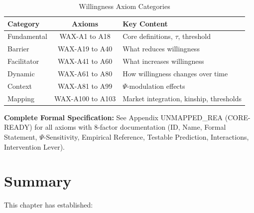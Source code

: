\begin{table}[h]
\centering
\caption{Willingness Axiom Categories}
\label{tab:axiom-categories}
\begin{tabular}{lcp{6cm}}
\toprule
\textbf{Category} & \textbf{Axioms} & \textbf{Key Content}\\
\midrule
Fundamental & WAX-A1 to A18 & Core definitions, $\tau$, threshold\\
Barrier & WAX-A19 to A40 & What reduces willingness\\
Facilitator & WAX-A41 to A60 & What increases willingness\\
Dynamic & WAX-A61 to A80 & How willingness changes over time\\
Context & WAX-A81 to A99 & $\Psi$-modulation effects\\
Mapping & WAX-A100 to A103 & Market integration, kinship, thresholds\\
\bottomrule
\end{tabular}
\end{table}

\begin{cross-reference}
\textbf{Complete Formal Specification:} See Appendix UNMAPPED_REA (CORE-READY) for all axioms
with 8-factor documentation (ID, Name, Formal Statement, $\Psi$-Sensitivity,
Empirical Reference, Testable Prediction, Interactions, Intervention Lever).
\end{cross-reference}



\section{Summary}
\label{sec:12-summary}


This chapter has established:


